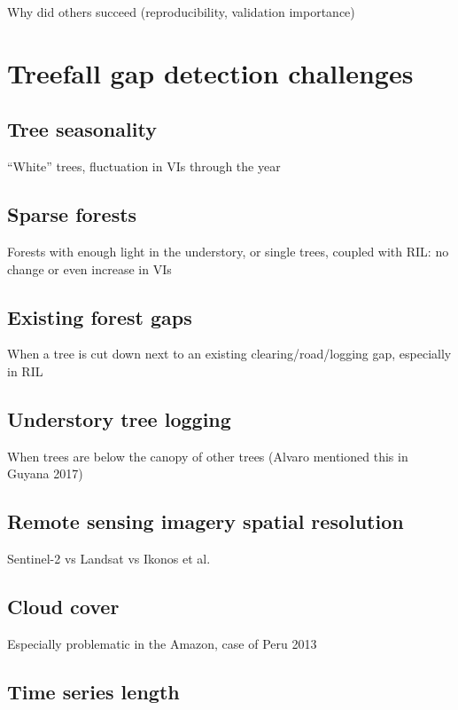 \documentclass[a4paper,12pt]{scrbook}
\begin{document}
Why did others succeed (reproducibility, validation importance)

\section{Treefall gap detection challenges}

\subsection{Tree seasonality}

``White'' trees, fluctuation in VIs through the year

\subsection{Sparse forests}

Forests with enough light in the understory, or single trees, coupled with \ac{RIL}: no change or even increase in VIs

\subsection{Existing forest gaps}

When a tree is cut down next to an existing clearing/road/logging gap, especially in \ac{RIL}

\subsection{Understory tree logging}

When trees are below the canopy of other trees (Alvaro mentioned this in Guyana 2017)

\subsection{Remote sensing imagery spatial resolution}

Sentinel-2 vs Landsat vs Ikonos et al.

\subsection{Cloud cover}

Especially problematic in the Amazon, case of Peru 2013

\subsection{Time series length}
\end{document}
